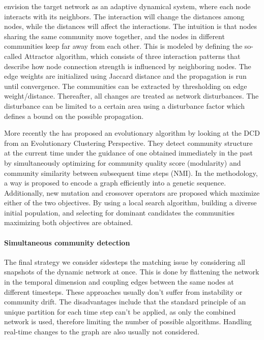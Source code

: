 \documentclass[
acmsmall,
nonacm,
screen,
acmthm]{acmart}
\begin{document}
\citet{guoDynamicCommunityDetection2016} envision the target network as
an adaptive dynamical system, where each node interacts with its
neighbors. The interaction will change the distances among nodes, while
the distances will affect the interactions. The intuition is that nodes
sharing the same community move together, and the nodes in different
communities keep far away from each other. This is modeled by defining
the so-called Attractor algorithm, which consists of three interaction
patterns that describe how node connection strength is influenced by
neighboring nodes. The edge weights are initialized using Jaccard
distance and the propagation is run until convergence. The communities
can be extracted by thresholding on edge weight/distance. Thereafter,
all changes are treated as network disturbances. The disturbance can be
limited to a certain area using a disturbance factor which defines a
bound on the possible propagation.

More recently the \citet{yinMultiobjectiveEvolutionaryClustering2021}
has proposed an evolutionary algorithm by looking at the DCD from an
Evolutionary Clustering Perspective. They detect community structure at
the current time under the guidance of one obtained immediately in the
past by simultaneously optimizing for community quality score
(modularity) and community similarity between subsequent time steps
(NMI). In the methodology, a way is proposed to encode a graph
efficiently into a genetic sequence. Additionally, new mutation and
crossover operators are proposed which maximize either of the two
objectives. By using a local search algorithm, building a diverse
initial population, and selecting for dominant candidates the
communities maximizing both objectives are obtained.

\hypertarget{simultaneous-community-detection}{%
\paragraph{Simultaneous community
detection}\label{simultaneous-community-detection}}

The final strategy we consider sidesteps the matching issue by
considering all snapshots of the dynamic network at once. This is done
by flattening the network in the temporal dimension and coupling edges
between the same nodes at different timesteps. These approaches usually
don't suffer from instability or community drift. The disadvantages
include that the standard principle of an unique partition for each time
step can't be applied, as only the combined network is used, therefore
limiting the number of possible algorithms. Handling real-time changes
to the graph are also usually not considered.
\end{document}

